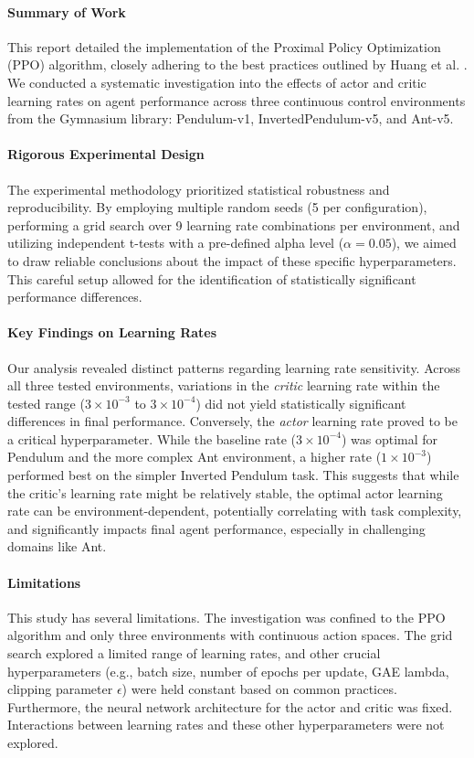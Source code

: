 \documentclass{article}
\begin{document}
\paragraph{Summary of Work}
This report detailed the implementation of the Proximal Policy Optimization (PPO) algorithm, closely adhering to the best practices outlined by Huang et al. \cite{shengyi2022the37implementation}. We conducted a systematic investigation into the effects of actor and critic learning rates on agent performance across three continuous control environments from the Gymnasium library: Pendulum-v1, InvertedPendulum-v5, and Ant-v5.

\paragraph{Rigorous Experimental Design}
The experimental methodology prioritized statistical robustness and reproducibility. By employing multiple random seeds (5 per configuration), performing a grid search over 9 learning rate combinations per environment, and utilizing independent t-tests with a pre-defined alpha level (\(\alpha=0.05\)), we aimed to draw reliable conclusions about the impact of these specific hyperparameters. This careful setup allowed for the identification of statistically significant performance differences.

\paragraph{Key Findings on Learning Rates}
Our analysis revealed distinct patterns regarding learning rate sensitivity. Across all three tested environments, variations in the \textit{critic} learning rate within the tested range (\(3 \times 10^{-3}\) to \(3 \times 10^{-4}\)) did not yield statistically significant differences in final performance. Conversely, the \textit{actor} learning rate proved to be a critical hyperparameter. While the baseline rate (\(3 \times 10^{-4}\)) was optimal for Pendulum and the more complex Ant environment, a higher rate (\(1 \times 10^{-3}\)) performed best on the simpler Inverted Pendulum task. This suggests that while the critic's learning rate might be relatively stable, the optimal actor learning rate can be environment-dependent, potentially correlating with task complexity, and significantly impacts final agent performance, especially in challenging domains like Ant.

\paragraph{Limitations}
This study has several limitations. The investigation was confined to the PPO algorithm and only three environments with continuous action spaces. The grid search explored a limited range of learning rates, and other crucial hyperparameters (e.g., batch size, number of epochs per update, GAE lambda, clipping parameter \(\epsilon\)) were held constant based on common practices. Furthermore, the neural network architecture for the actor and critic was fixed. Interactions between learning rates and these other hyperparameters were not explored.
\end{document}
